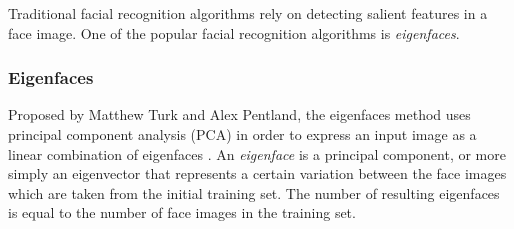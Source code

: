 Traditional facial recognition algorithms rely on detecting salient features in a face image. One of the popular facial recognition algorithms is \textit{eigenfaces}.

\subsubsection{Eigenfaces}
Proposed by Matthew Turk and Alex Pentland, the eigenfaces method uses principal component analysis (PCA) in order to express an input image as a linear combination of eigenfaces \cite{turk_eigenfaces_1991}. An \textit{eigenface} is a principal component, or more simply an eigenvector that represents a certain variation between the face images which are taken from the initial training set. The number of resulting eigenfaces is equal to the number of face images in the training set.





